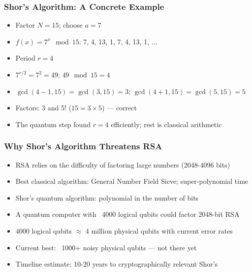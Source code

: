 \begin{frame}[fragile]\frametitle{Shor's Algorithm: A Concrete Example}
\begin{itemize}
\item Factor $N = 15$; choose $a = 7$
\item $f(x) = 7^x \mod 15$: 7, 4, 13, 1, 7, 4, 13, 1, ...
\item Period $r = 4$
\item $7^{r/2} = 7^2 = 49$; $49 \mod 15 = 4$
\item $\gcd(4-1, 15) = \gcd(3, 15) = 3$; $\gcd(4+1, 15) = \gcd(5, 15) = 5$
\item Factors: 3 and 5! ($15 = 3 \times 5$) --- correct
\item The quantum step found $r=4$ efficiently; rest is classical arithmetic
\end{itemize}
\end{frame}

\begin{frame}[fragile]\frametitle{Why Shor's Algorithm Threatens RSA}
\begin{itemize}
\item RSA relies on the difficulty of factoring large numbers (2048-4096 bits)
\item Best classical algorithm: General Number Field Sieve; super-polynomial time
\item Shor's quantum algorithm: polynomial in the number of bits
\item A quantum computer with ~4000 logical qubits could factor 2048-bit RSA
\item 4000 logical qubits $\approx$ 4 million physical qubits with current error rates
\item Current best: ~1000+ noisy physical qubits --- not there yet
\item Timeline estimate: 10-20 years to cryptographically relevant Shor's
\end{itemize}
\end{frame}

